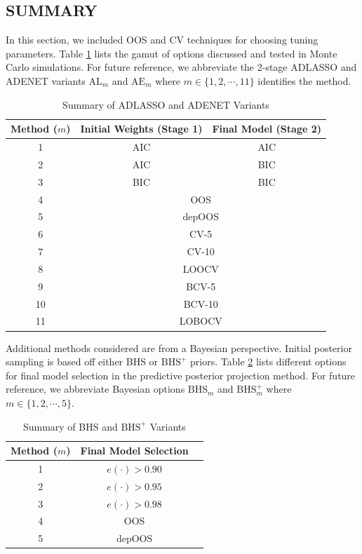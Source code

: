 \subsection{SUMMARY}

In this section, we included OOS and CV techniques for choosing tuning parameters. Table \ref{tab:aicbic} lists the gamut of options discussed and tested in Monte Carlo simulations. For future reference, we abbreviate the 2-stage ADLASSO and ADENET variants $\textrm{AL}_m$ and $\textrm{AE}_m$ where $m \in \{1,2,\cdots,11\}$ identifies the method. 

\begin{table}[!h]
  \footnotesize
  \centering
  \caption{Summary of ADLASSO and ADENET Variants}
    \begin{tabular}{c|cc}
    \toprule
    Method ($m$) & Initial Weights (Stage 1) & Final Model (Stage 2)  \\
    \midrule
    1 & AIC & AIC\\
    2 & AIC & BIC \\
    3 & BIC & BIC \\
    \midrule
    4 & \multicolumn{2}{c}{OOS} \\
    5 & \multicolumn{2}{c}{depOOS} \\
    \midrule
    6 & \multicolumn{2}{c}{CV-5} \\
    7 & \multicolumn{2}{c}{CV-10} \\
    8 & \multicolumn{2}{c}{LOOCV} \\
    \midrule
    9 & \multicolumn{2}{c}{BCV-5} \\
    10 & \multicolumn{2}{c}{BCV-10} \\
    11 & \multicolumn{2}{c}{LOBOCV} \\
    \bottomrule
    \end{tabular}%
  \label{tab:aicbic}%
\end{table}%

Additional methods considered are from a Bayesian perspective. Initial posterior sampling is based off either BHS or $\textrm{BHS}^+$ priors. Table \ref{tab:bhstypes} lists different options for final model selection in the predictive posterior projection method. For future reference, we abbreviate Bayesian options $\textrm{BHS}_m$ and $\textrm{BHS}^+_m$ where $m \in \{1,2,\cdots,5\}$. 

\begin{table}[!h]
  \footnotesize
  \centering
  \caption{Summary of BHS and $\textrm{BHS}^+$ Variants }
    \begin{tabular}{c|cc}
    \toprule
    Method ($m$) & Final Model Selection  \\
    \midrule
    1 & $e(\cdot)>0.90$ \\
    2 & $e(\cdot)>0.95$ \\
    3 & $e(\cdot)>0.98$\\
    \midrule
    4 & OOS\\
    5 & depOOS\\
    \bottomrule
    \end{tabular}%
  \label{tab:bhstypes}%
\end{table}%








